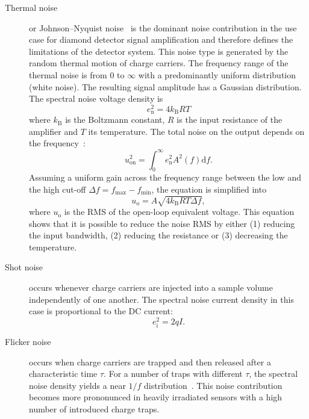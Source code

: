 \begin{description}
\item[Thermal noise]
or Johnson--Nyquist noise~\cite{PhysRev.32.97,PhysRev.32.110} is the dominant noise contribution in the use case for diamond detector signal amplification and therefore defines the limitations of the detector system. This noise type is generated by the random thermal motion of charge carriers. The frequency range of the thermal noise is from 0 to $\infty$ with a predominantly uniform distribution (white noise). The resulting signal amplitude has a Gaussian distribution. The spectral noise voltage density is
\begin{equation}
e^2_\mathrm{n} = 4 k_\mathrm{B}RT
\end{equation}
where $k_\mathrm{B}$ is the Boltzmann constant, $R$ is the input resistance of the amplifier and $T$ its temperature. The total noise on the output depends on the frequency~\cite{Spieler:1010490}:
\begin{equation}
u^2_\mathrm{on}=\int^\infty_0 e^2_\mathrm{n}A^2(f) \mathrm{d}f.
\end{equation}
Assuming a uniform gain across the frequency range between the low and the high cut-off $\Delta f = f_\mathrm{max}-f_\mathrm{min}$, the equation is simplified into
\begin{equation}
u_\mathrm{o}=A\sqrt{4k_\mathrm{B}RT\Delta f},
\end{equation}
where $u_\mathrm{o}$ is the RMS of the open-loop equivalent voltage. This equation shows that it is possible to reduce the noise RMS by either (1) reducing the input bandwidth, (2) reducing the resistance or (3) decreasing the temperature. 

\item[Shot noise]
occurs whenever charge carriers are injected into a sample volume independently of one another. The spectral noise current density in this case is proportional to the DC current:
\begin{equation}
e^2_\mathrm{i} = 2 q I.
\end{equation}

\item[Flicker noise]
occurs when charge carriers are trapped and then released after a characteristic time $\tau$. For a number of traps with different $\tau$, the spectral noise density yields a near $1/f$ distribution~\cite{Spieler:1010490}. This noise contribution becomes more prononunced in heavily irradiated sensors with a high number of introduced charge traps.
\end{description}











